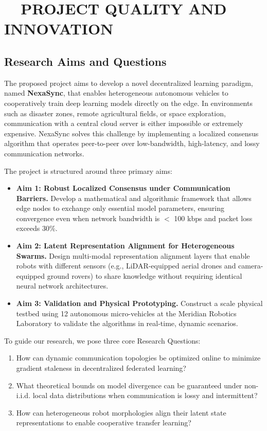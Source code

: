 \section{\texorpdfstring{\faPen\ \ }{ }PROJECT QUALITY AND INNOVATION}
\subsection{Research Aims and Questions}
The proposed project aims to develop a novel decentralized learning paradigm, named \textbf{NexaSync}, that enables heterogeneous autonomous vehicles to cooperatively train deep learning models directly on the edge. In environments such as disaster zones, remote agricultural fields, or space exploration, communication with a central cloud server is either impossible or extremely expensive. NexaSync solves this challenge by implementing a localized consensus algorithm that operates peer-to-peer over low-bandwidth, high-latency, and lossy communication networks.

The project is structured around three primary aims:
\begin{itemize}[leftmargin=*,noitemsep]
    \item \textbf{Aim 1: Robust Localized Consensus under Communication Barriers.} Develop a mathematical and algorithmic framework that allows edge nodes to exchange only essential model parameters, ensuring convergence even when network bandwidth is $<$ 100 kbps and packet loss exceeds 30\%.
    \item \textbf{Aim 2: Latent Representation Alignment for Heterogeneous Swarms.} Design multi-modal representation alignment layers that enable robots with different sensors (e.g., LiDAR-equipped aerial drones and camera-equipped ground rovers) to share knowledge without requiring identical neural network architectures.
    \item \textbf{Aim 3: Validation and Physical Prototyping.} Construct a scale physical testbed using 12 autonomous micro-vehicles at the Meridian Robotics Laboratory to validate the algorithms in real-time, dynamic scenarios.
\end{itemize}

To guide our research, we pose three core Research Questions:
\begin{enumerate}[label=\textbf{RQ\arabic*}:,leftmargin=*,noitemsep]
    \item How can dynamic communication topologies be optimized online to minimize gradient staleness in decentralized federated learning?
    \item What theoretical bounds on model divergence can be guaranteed under non-i.i.d. local data distributions when communication is lossy and intermittent?
    \item How can heterogeneous robot morphologies align their latent state representations to enable cooperative transfer learning?
\end{enumerate}

